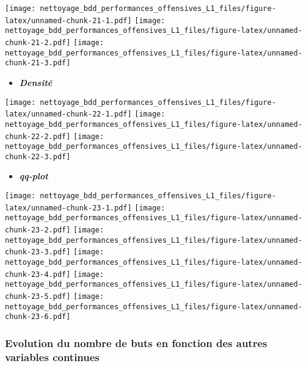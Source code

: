 \documentclass[7pt,]{report}
\newenvironment{Shaded}{\begin{snugshade}}{\end{snugshade}}
\newcommand{\KeywordTok}[1]{\textcolor[rgb]{0.13,0.29,0.53}{\textbf{#1}}}
\newcommand{\NormalTok}[1]{#1}
\newcommand{\OperatorTok}[1]{\textcolor[rgb]{0.81,0.36,0.00}{\textbf{#1}}}
\providecommand{\tightlist}{%
  \setlength{\itemsep}{0pt}\setlength{\parskip}{0pt}}
\begin{document}
\texttt{[image: nettoyage\_bdd\_performances\_offensives\_L1\_files/figure-latex/unnamed-chunk-21-1.pdf]} \texttt{[image: nettoyage\_bdd\_performances\_offensives\_L1\_files/figure-latex/unnamed-chunk-21-2.pdf]} \texttt{[image: nettoyage\_bdd\_performances\_offensives\_L1\_files/figure-latex/unnamed-chunk-21-3.pdf]}

\begin{itemize}
\tightlist
\item
  \textbf{\emph{Densité}}
\end{itemize}

\begin{Shaded}
\end{Shaded}

\texttt{[image: nettoyage\_bdd\_performances\_offensives\_L1\_files/figure-latex/unnamed-chunk-22-1.pdf]} \texttt{[image: nettoyage\_bdd\_performances\_offensives\_L1\_files/figure-latex/unnamed-chunk-22-2.pdf]} \texttt{[image: nettoyage\_bdd\_performances\_offensives\_L1\_files/figure-latex/unnamed-chunk-22-3.pdf]}

\begin{itemize}
\tightlist
\item
  \textbf{\emph{qq-plot}}
\end{itemize}

\begin{Shaded}
\end{Shaded}

\texttt{[image: nettoyage\_bdd\_performances\_offensives\_L1\_files/figure-latex/unnamed-chunk-23-1.pdf]} \texttt{[image: nettoyage\_bdd\_performances\_offensives\_L1\_files/figure-latex/unnamed-chunk-23-2.pdf]} \texttt{[image: nettoyage\_bdd\_performances\_offensives\_L1\_files/figure-latex/unnamed-chunk-23-3.pdf]} \texttt{[image: nettoyage\_bdd\_performances\_offensives\_L1\_files/figure-latex/unnamed-chunk-23-4.pdf]} \texttt{[image: nettoyage\_bdd\_performances\_offensives\_L1\_files/figure-latex/unnamed-chunk-23-5.pdf]} \texttt{[image: nettoyage\_bdd\_performances\_offensives\_L1\_files/figure-latex/unnamed-chunk-23-6.pdf]}

\hypertarget{evolution-du-nombre-de-buts-en-fonction-des-autres-variables-continues}{%
\subsubsection{Evolution du nombre de buts en fonction des autres variables continues}\label{evolution-du-nombre-de-buts-en-fonction-des-autres-variables-continues}}
\end{document}
